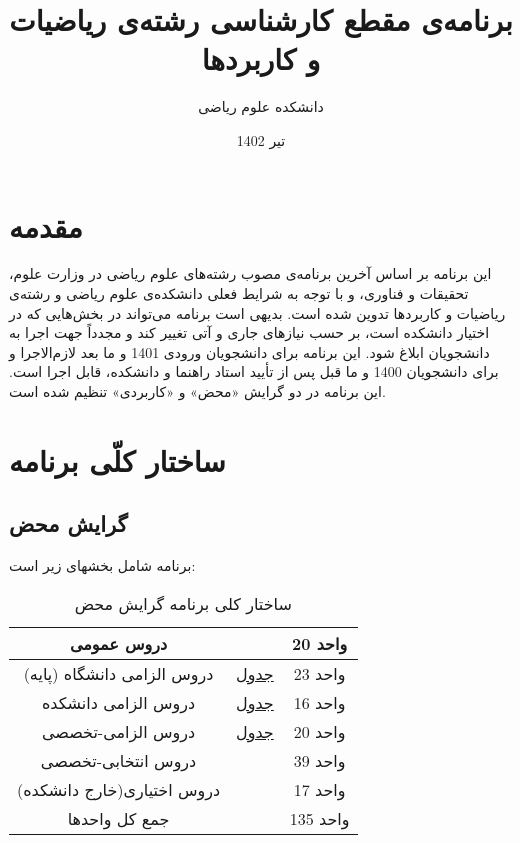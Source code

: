 \documentclass{article}
\title{
برنامه‌ی مقطع کارشناسی رشته‌ی ریاضیات و کاربردها
}
\author{
دانشکده علوم ریاضی
}
\date{
    تیر 1402
}
\begin{document}
    \maketitle
    \section{مقدمه }
    این برنامه بر اساس آخرین برنامه‌ی مصوب رشته‌های علوم ریاضی در وزارت علوم، تحقیقات و فناوری، و با توجه به شرایط فعلی دانشکده‌ی علوم ریاضی و رشته‌ی ریاضیات و کاربردها تدوین شده است. بدیهی است برنامه می‌تواند در بخش‌هایی که در اختیار دانشکده است، بر حسب نیازهای جاری و آتی تغییر کند و مجدداً جهت اجرا به دانشجویان ابلاغ شود. این برنامه برای دانشجویان ورودی 1401 و ما بعد لازم‌الاجرا و برای دانشجویان 1400 و ما قبل پس از تأیید استاد راهنما و دانشکده، قابل اجرا است. این برنامه در دو گرایش «محض» و «کاربردی» تنظیم شده است.
	\pagebreak
	\tableofcontents
	\pagebreak
    \listoftables
    \newpage

    \section{ساختار کلّی برنامه}
    \subsection{
    گرایش محض
}
    برنامه شامل بخشهای زیر است:
    \begin{table}[H]
    \begin{center}
        \begin{tabular}{|c | c | c|}
            \hline
            {دروس عمومی} & & {20 واحد} \\
            \hline
            {
            	دروس الزامی دانشگاه (پایه)
            	}
            & {
   			\href{math-t1}{
   			جدول 
   			}
            	 } & {23 واحد} \\
            \hline
            {دروس الزامی دانشکده} & {
            		\href{math-t2}{
            		جدول 
            		}
            } & {16 واحد} \\
            \hline
            {دروس الزامی-تخصصی} & {
            		\href{math-t3-1}{
            		جدول 
            		}
            } & {20 واحد} \\
            \hline
            {دروس انتخابی-تخصصی} & & {39 واحد} \\
            \hline
            {دروس اختیاری(خارج دانشکده) } & & {17 واحد} \\
            \hline
            {جمع کل واحدها} & & {135 واحد} \\
            \hline
        \end{tabular}
		\caption{\label{math-t1}
	ساختار کلی برنامه گرایش محض
		}
		\end{center}
		\end{table}
\end{document}

